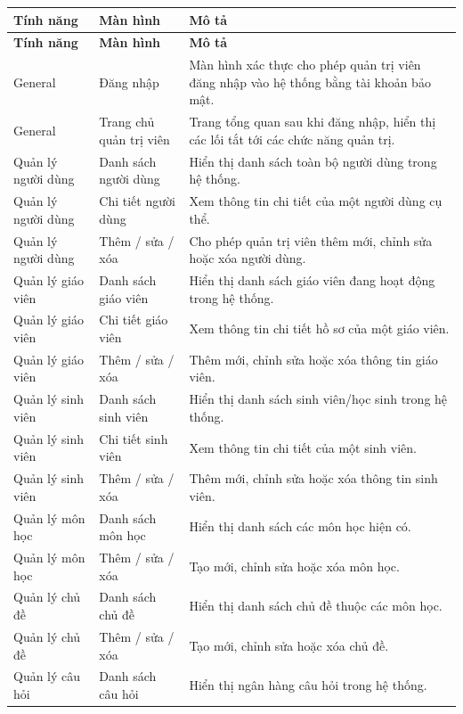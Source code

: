 \documentclass[11pt,a4paper]{article}
\begin{document}
\begin{longtable}{|L{3.0cm}|L{3.6cm}|L{8.0cm}|}
\hline
{}
\textbf{Tính năng} & \textbf{Màn hình} & \textbf{Mô tả} \\ \hline
\endfirsthead
\hline
{}
\textbf{Tính năng} & \textbf{Màn hình} & \textbf{Mô tả} \\ \hline
\endhead
General & Đăng nhập & Màn hình xác thực cho phép quản trị viên đăng nhập vào hệ thống bằng tài khoản bảo mật. \\ \hline
General & Trang chủ quản trị viên & Trang tổng quan sau khi đăng nhập, hiển thị các lối tắt tới các chức năng quản trị. \\ \hline
Quản lý người dùng & Danh sách người dùng & Hiển thị danh sách toàn bộ người dùng trong hệ thống. \\ \hline
Quản lý người dùng & Chi tiết người dùng & Xem thông tin chi tiết của một người dùng cụ thể. \\ \hline
Quản lý người dùng & Thêm / sửa / xóa & Cho phép quản trị viên thêm mới, chỉnh sửa hoặc xóa người dùng. \\ \hline
Quản lý giáo viên & Danh sách giáo viên & Hiển thị danh sách giáo viên đang hoạt động trong hệ thống. \\ \hline
Quản lý giáo viên & Chi tiết giáo viên & Xem thông tin chi tiết hồ sơ của một giáo viên. \\ \hline
Quản lý giáo viên & Thêm / sửa / xóa & Thêm mới, chỉnh sửa hoặc xóa thông tin giáo viên. \\ \hline
Quản lý sinh viên & Danh sách sinh viên & Hiển thị danh sách sinh viên/học sinh trong hệ thống. \\ \hline
Quản lý sinh viên & Chi tiết sinh viên & Xem thông tin chi tiết của một sinh viên. \\ \hline
Quản lý sinh viên & Thêm / sửa / xóa & Thêm mới, chỉnh sửa hoặc xóa thông tin sinh viên. \\ \hline
Quản lý môn học & Danh sách môn học & Hiển thị danh sách các môn học hiện có. \\ \hline
Quản lý môn học & Thêm / sửa / xóa & Tạo mới, chỉnh sửa hoặc xóa môn học. \\ \hline
Quản lý chủ đề & Danh sách chủ đề & Hiển thị danh sách chủ đề thuộc các môn học. \\ \hline
Quản lý chủ đề & Thêm / sửa / xóa & Tạo mới, chỉnh sửa hoặc xóa chủ đề. \\ \hline
Quản lý câu hỏi & Danh sách câu hỏi & Hiển thị ngân hàng câu hỏi trong hệ thống. \\ \hline

\end{longtable}
\end{document}
